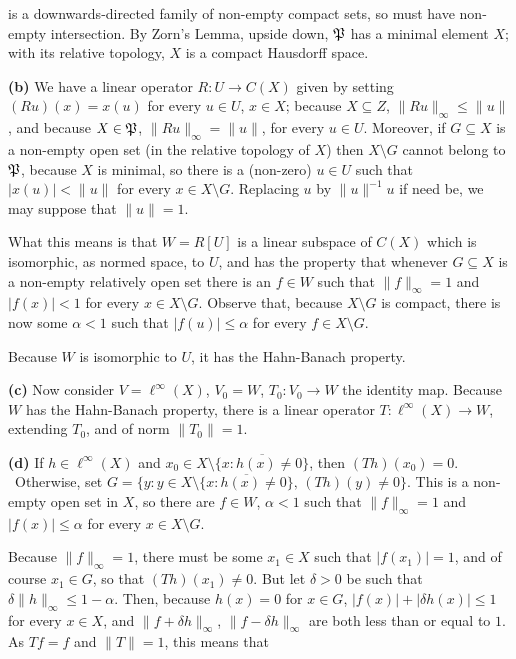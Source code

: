 {

\noindent is a downwards-directed family of non-empty compact sets, so
must have non-empty intersection.   By Zorn's Lemma, upside down,
$\frak P$ has a minimal element $X$;  with its relative topology, $X$ is a
compact Hausdorff space.

\medskip

{\bf (b)} We have a linear operator $R:U\to C(X)$ given by setting
$(Ru)(x)=x(u)$ for every $u\in U$, $x\in X$;  because $X\subseteq Z$,
$\|Ru\|_{\infty}\le\|u\|$, and because $X\in\frak P$,
$\|Ru\|_{\infty}=\|u\|$, for every $u\in U$.   Moreover, if
$G\subseteq X$ is a non-empty open set (in the relative topology of $X$)
then
$X\setminus G$ cannot belong to $\frak P$, because $X$ is minimal, so
there is a (non-zero) $u\in U$ such that $|x(u)|<\|u\|$ for every
$x\in X\setminus G$.   Replacing $u$ by $\|u\|^{-1}u$ if need be, we may
suppose that $\|u\|=1$.

What this means is that $W=R[U]$ is a linear subspace of $C(X)$ which is
isomorphic, as normed space, to $U$, and has the property that whenever
$G\subseteq X$ is a non-empty relatively open set there is an $f\in W$
such that $\|f\|_{\infty}=1$ and $|f(x)|<1$ for every $x\in X\setminus G$.
Observe that, because $X\setminus G$ is
compact, there is now some $\alpha<1$ such that $|f(u)|\le\alpha$ for
every $f\in X\setminus G$.

Because $W$ is isomorphic to $U$, it has the Hahn-Banach property.

\medskip

{\bf (c)} Now consider $V=\ell^{\infty}(X)$, $V_0=W$,
$T_0:V_0\to W$ the identity map.   Because $W$ has the Hahn-Banach
property, there is a linear operator $T:\ell^{\infty}(X)\to W$,
extending $T_0$, and of norm $\|T_0\|=1$.

\medskip

{\bf (d)} If $h\in\ell^{\infty}(X)$ and $x_0\in
X\setminus\overline{\{x:h(x)\ne 0\}}$, then $(Th)(x_0)=0$.   \Prf\Quer\
Otherwise, set
$G=\{y:y\in X\setminus\overline{\{x:h(x)\ne 0\}},\,(Th)(y)\ne 0\}$.
This is a non-empty open set in $X$, so there
are $f\in W$, $\alpha<1$ such that $\|f\|_{\infty}=1$
and $|f(x)|\le\alpha$ for every $x\in X\setminus G$.

Because $\|f\|_{\infty}=1$, there must be some $x_1\in X$ such that
$|f(x_1)|=1$,
and of course $x_1\in G$, so that $(Th)(x_1)\ne 0$.   But let
$\delta>0$ be such that $\delta\|h\|_{\infty}\le 1-\alpha$.   Then,
because $h(x)=0$ for $x\in G$,
$|f(x)|+|\delta h(x)|\le 1$
for every $x\in X$, and $\|f+\delta h\|_{\infty}$,
$\|f-\delta h\|_{\infty}$ are both less than or equal to $1$.   As
$Tf=f$ and $\|T\|=1$,
this means that

}
